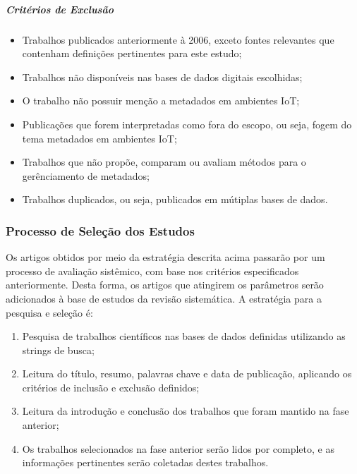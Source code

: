 \subparagraph{Critérios de Exclusão}
\begin{itemize}
  \item Trabalhos publicados anteriormente à 2006, exceto fontes relevantes que contenham definições pertinentes para este estudo;
  \item Trabalhos não disponíveis nas bases de dados digitais escolhidas;
  \item O trabalho não possuir menção a metadados em ambientes \acrlong{IoT};
  \item Publicações que forem interpretadas como fora do escopo, ou seja, fogem do tema metadados em ambientes \acrshort{IoT};
  \item Trabalhos que não propõe, comparam ou avaliam métodos para o gerênciamento de metadados;
  \item Trabalhos duplicados, ou seja, publicados em mútiplas bases de dados.
\end{itemize}

\subsubsection{Processo de Seleção dos Estudos}
\quad Os artigos obtidos por meio da estratégia descrita acima passarão por um processo de avaliação sistêmico, com base nos critérios especificados anteriormente.
Desta forma, os artigos que atingirem os parâmetros serão adicionados à base de estudos da revisão sistemática. A estratégia para a pesquisa e seleção é:
\begin{enumerate}
  \item Pesquisa de trabalhos científicos nas bases de dados definidas utilizando as strings de busca;
  \item Leitura do título, resumo, palavras chave e data de publicação, aplicando os critérios de inclusão e exclusão definidos;
  \item Leitura da introdução e conclusão dos trabalhos que foram mantido na fase anterior;
  \item Os trabalhos selecionados na fase anterior serão lidos por completo, e as informações pertinentes serão coletadas destes trabalhos.
\end{enumerate}





